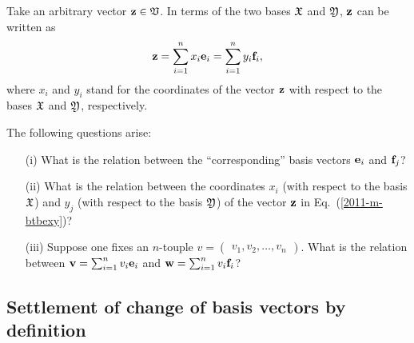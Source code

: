 Take an arbitrary vector ${\bf z}\in {\frak V}$.
In terms of the two bases
${\frak X}$ and
${\frak Y}$,
${\bf z}$ can be written as
\begin{equation}
{\bf z}=
\sum_{i=1}^n x_i{\bf e}_i
=
\sum_{i=1}^n  y_i{\bf f}_i,
\label{2011-m-btbexy}
\end{equation}
where $x_i$ and $y_i$ stand for the coordinates of the vector  ${\bf z}$
with respect to the bases ${\frak X}$ and
${\frak Y}$,
respectively.

The following questions arise:
\begin{itemize}
\item[(i)]
What is the relation between the ``corresponding'' basis vectors ${\bf e}_i$ and ${\bf f}_j$?
\item[(ii)]
What is the relation between the coordinates $x_i$ (with respect to the basis  ${\frak X}$) and $y_j$ (with respect to the basis  ${\frak Y}$)  of the vector ${\bf z}$ in Eq.~(\ref{2011-m-btbexy})?
\item[(iii)]
Suppose one fixes
an $n$-touple $v = \begin{pmatrix} v_1, v_2, \ldots , v_n \end{pmatrix}$.
What is the relation between
${\bf v} =
\sum_{i=1}^n v_i {\bf e}_i
$
and
${\bf w}=
\sum_{i=1}^n v_i {\bf f}_i
$?
\end{itemize}

\subsection{Settlement of change of basis vectors by definition}

